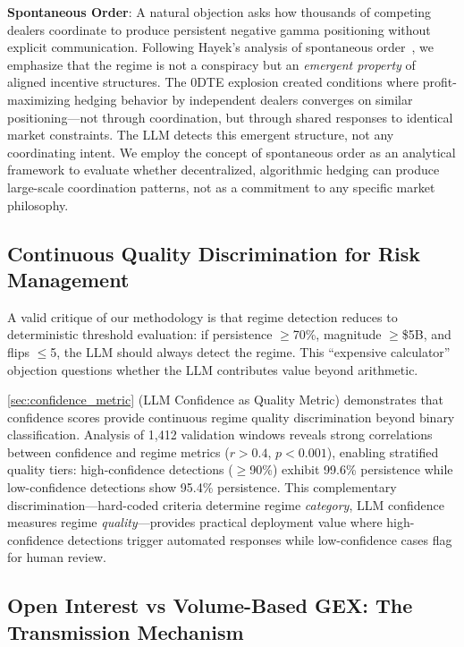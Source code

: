 \noindent\textbf{Spontaneous Order}: A natural objection asks how thousands of competing dealers coordinate to produce persistent negative gamma positioning without explicit communication. Following Hayek's analysis of spontaneous order~\citep{hayek1945}, we emphasize that the regime is not a conspiracy but an \textit{emergent property} of aligned incentive structures. The 0DTE explosion created conditions where profit-maximizing hedging behavior by independent dealers converges on similar positioning---not through coordination, but through shared responses to identical market constraints. The LLM detects this emergent structure, not any coordinating intent. We employ the concept of spontaneous order as an analytical framework to evaluate whether decentralized, algorithmic hedging can produce large-scale coordination patterns, not as a commitment to any specific market philosophy.

\subsection{Continuous Quality Discrimination for Risk Management}

\vspace{0.2cm}

A valid critique of our methodology is that regime detection reduces to deterministic threshold evaluation: if persistence $\geq$70\%, magnitude $\geq$\$5B, and flips $\leq$5, the LLM should always detect the regime. This ``expensive calculator'' objection questions whether the LLM contributes value beyond arithmetic.

\vspace{0.2cm}

\ref{sec:confidence_metric} (LLM Confidence as Quality Metric) demonstrates that confidence scores provide continuous regime quality discrimination beyond binary classification. Analysis of 1,412 validation windows reveals strong correlations between confidence and regime metrics ($r > 0.4$, $p < 0.001$), enabling stratified quality tiers: high-confidence detections ($\geq$90\%) exhibit 99.6\% persistence while low-confidence detections show 95.4\% persistence. This complementary discrimination—hard-coded criteria determine regime \textit{category}, LLM confidence measures regime \textit{quality}—provides practical deployment value where high-confidence detections trigger automated responses while low-confidence cases flag for human review.

\subsection{Open Interest vs Volume-Based GEX: The Transmission Mechanism}

